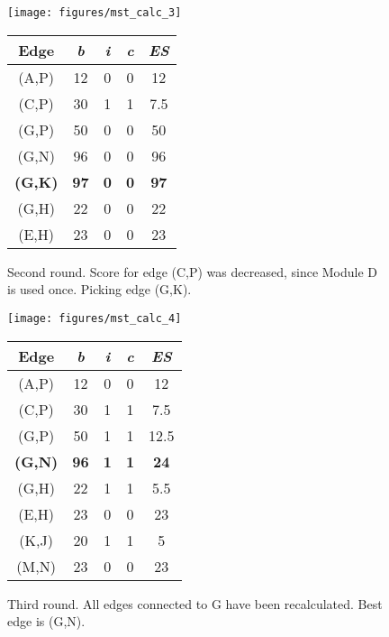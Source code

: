       \begin{figure}[h!]
	\centering
	\begin{minipage}{0.5\textwidth}
	  \texttt{[image: figures/mst\_calc\_3]}
	\end{minipage}
	\begin{minipage}{0.35\textwidth}
	  \begin{tabular}{c||c|c|c||c}
	    Edge & \textit{b} & \textit{i} & \textit{c} & \textit{ES}\\ \hline\hline
	    (A,P) & 12 & 0 & 0 & 12 \\ \hline
	    (C,P) & 30 & 1 & 1 & 7.5 \\ \hline
	    (G,P) & 50 & 0 & 0 & 50 \\ \hline
	    (G,N) & 96 & 0 & 0 & 96 \\ \hline
	    \textbf{(G,K)} & \textbf{97} & \textbf{0} & \textbf{0} & \textbf{97} \\ \hline
	    (G,H) & 22 & 0 & 0 & 22 \\ \hline
	    (E,H) & 23 & 0 & 0 & 23 \\ \hline
	  \end{tabular}
	\end{minipage}
	\caption{Second round. Score for edge (C,P) was decreased, since Module D is used once. Picking edge (G,K).}
	\label{fig:mst_calc_3}
      \end{figure}
      
      \newpage
      
      \begin{figure}[h!]
	\centering
	\begin{minipage}{0.5\textwidth}
	  \texttt{[image: figures/mst\_calc\_4]}
	\end{minipage}
	\begin{minipage}{0.49\textwidth}
	  \begin{tabular}{c||c|c|c||c}
	    Edge & \textit{b} & \textit{i} & \textit{c} & \textit{ES}\\ \hline\hline
	    (A,P) & 12 & 0 & 0 & 12 \\ \hline
	    (C,P) & 30 & 1 & 1 & 7.5 \\ \hline
	    (G,P) & 50 & 1 & 1 & 12.5 \\ \hline
	    \textbf{(G,N)} & \textbf{96} & \textbf{1} & \textbf{1} & \textbf{24} \\ \hline
	    (G,H) & 22 & 1 & 1 & 5.5 \\ \hline
	    (E,H) & 23 & 0 & 0 & 23 \\ \hline
	    (K,J) & 20 & 1 & 1 & 5 \\ \hline
	    (M,N) & 23 & 0 & 0 & 23 \\ \hline
	  \end{tabular}
	\end{minipage}
	\caption{Third round. All edges connected to G have been recalculated. Best edge is (G,N).}
	\label{fig:mst_calc_4}
      \end{figure}
      
